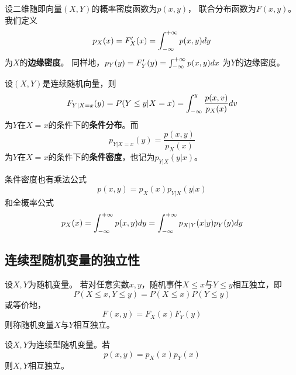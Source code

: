 \begin{definition}[边缘密度]
  设二维随即向量$(X,Y)$的概率密度函数为$p(x,y)$，
  联合分布函数为$F(x,y)$。
  我们定义
  \begin{displaymath}
    p_X(x)=F'_X(x) = \int_{-\infty}^{+\infty} p(x,y)dy
  \end{displaymath}
  为$X$的\textbf{边缘密度}。
  同样地，$p_Y(y)=F'_Y(y) = \int_{-\infty}^{+\infty} p(x,y)dx$
  为$Y$的边缘密度。
\end{definition}

\begin{definition}[二维连续型随机变量的条件密度]
  设$(X,Y)$是连续随机向量，则
  \begin{displaymath}
    F_{Y|X=x}(y)=P(Y\le y|X = x)=
      \int_{-\infty}^{y}\frac{p(x,v)}{p_X(x)}dv
  \end{displaymath}
  为$Y$在$X=x$的条件下的\textbf{条件分布}。而
  \begin{displaymath}
    p_{Y|X=x}(y)=\frac{p(x,y)}{p_X(x)}
  \end{displaymath}
  为$Y$在$X=x$的条件下的\textbf{条件密度}，也记为$p_{Y|X}(y|x)$。
\end{definition}

\begin{theorem}[条件密度的两个公式]
  条件密度也有乘法公式
  \begin{displaymath}
    p(x,y) = p_X(x)p_{Y|X}(y|x)
  \end{displaymath}
  和全概率公式
  \begin{displaymath}
    p_X(x) = \int_{-\infty}^{+\infty} p(x,y)dy
    = \int_{-\infty}^{+\infty} p_{X|Y}(x|y)p_Y(y)dy
  \end{displaymath}
\end{theorem}

\subsection{连续型随机变量的独立性}
\begin{definition}[两个随机变量的独立性]
  设$X,Y$为随机变量。
  若对任意实数$x,y$，随机事件$X\le x$与$Y\le y$相互独立，即
  \begin{displaymath}
    P(X\le x,  Y\le y)=P(X\le x)P(Y\le y)
  \end{displaymath}
  或等价地，
  \begin{displaymath}
    F(x,y)=F_X(x)F_Y(y)
  \end{displaymath}
  则称随机变量$X$与$Y$相互独立。
\end{definition}

\begin{theorem}[两个连续型随机变量相互独立的条件]
  设$X,Y$为连续型随机变量。若
  \begin{displaymath}
    p(x,y)=p_X(x)p_Y(x)
  \end{displaymath}
  则$X,Y$相互独立。
\end{theorem}


